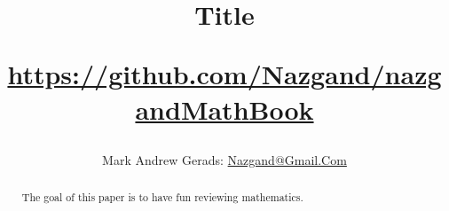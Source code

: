 \documentclass[]{article}
\author{Mark Andrew Gerads: \href{MailTo:Nazgand@Gmail.Com}{Nazgand@Gmail.Com}}
\date{\DTMnow}
\title{
	Title
	
	\href{https://github.com/Nazgand/nazgandMathBook}{https://github.com/Nazgand/nazgandMathBook}
}
\numberwithin{equation}{section}
\begin{document}
	
	\maketitle
	
	\begin{abstract}
		The goal of this paper is to have fun reviewing mathematics.
	\end{abstract}
	
\end{document}
